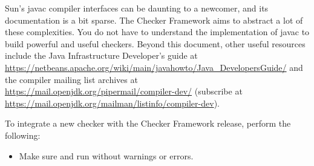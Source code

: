 
Sun's javac compiler interfaces can be daunting to a
newcomer, and its documentation is a bit sparse. The Checker Framework
aims to abstract a lot of these complexities.
You do not have to understand the implementation of javac to
build powerful and useful checkers.
Beyond this document,
other useful resources include the Java Infrastructure
Developer's guide at
\url{https://netbeans.apache.org/wiki/main/javahowto/Java_DevelopersGuide/} and the compiler
mailing list archives at
\url{https://mail.openjdk.org/pipermail/compiler-dev/}
(subscribe at
\url{https://mail.openjdk.org/mailman/listinfo/compiler-dev}).




To integrate a new checker with the Checker Framework release, perform
the following:

\begin{itemize}

\item Make sure  and  run
without warnings or errors.

\end{itemize}


